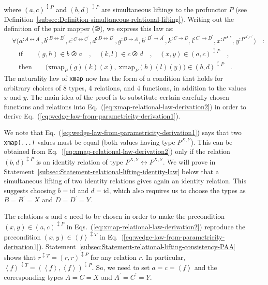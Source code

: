 where $(a,c)^{\updownarrow P}$ and $(b,d)^{\updownarrow P}$ are
simultaneous liftings to the profunctor $P$ (see Definition~\ref{subsec:Definition-simultaneous-relational-lifting}).
Writing out the definition of the pair mapper ($\ogreaterthan$),
we express this law as:
\begin{align}
 & \forall\big(a^{:A\leftrightarrow A^{\prime}},b^{:B\leftrightarrow B^{\prime}},c^{:C\leftrightarrow C^{\prime}},d^{:D\leftrightarrow D^{\prime}},g^{:B\rightarrow A},h^{:B^{\prime}\rightarrow A^{\prime}},k^{:C\rightarrow D},l^{:C^{\prime}\rightarrow D^{\prime}},x^{:P^{A,C}},y^{:P^{A^{\prime},C^{\prime}}}\big)\quad:\nonumber \\
 & \quad\text{if}\quad\quad(g,h)\in b\ogreaterthan a\quad,\quad(k,l)\in c\ogreaterthan d\quad,\quad(x,y)\in(a,c)^{\updownarrow P}\quad,\nonumber \\
 & \quad\text{then}\quad\quad\big(\text{xmap}_{P}(g)(k)(x),\:\text{xmap}_{P}(h)(l)(y)\big)\in(b,d)^{\updownarrow P}\quad.\label{eq:xmap-relational-law-derivation2}
\end{align}
The naturality law of \lstinline!xmap! now has the form of a condition
that holds for arbitrary choices of 8 types, 4 relations, and 4 functions,
in addition to the values $x$ and $y$. The main idea of the proof
is to substitute certain carefully chosen functions and relations
into Eq.~(\ref{eq:xmap-relational-law-derivation2}) in order to
derive Eq.~(\ref{eq:wedge-law-from-parametricity-derivation1}). 

We note that Eq.~(\ref{eq:wedge-law-from-parametricity-derivation1})
says that two \lstinline!xmap(...)! values must be equal (both values
having type $P^{X,Y}$). This can be obtained from Eq.~(\ref{eq:xmap-relational-law-derivation2})
only if the relation $(b,d)^{\updownarrow P}$ is an identity relation
of type $P^{X,Y}\leftrightarrow P^{X,Y}$. We will prove in Statement~\ref{subsec:Statement-relational-lifting-identity-law}
below that a simultaneous lifting of two identity relations gives
again an identity relation. This suggests choosing $b=\text{id}$
and $d=\text{id}$, which also requires us to choose the types as
$B=B^{\prime}=X$ and $D=D^{\prime}=Y$.

The relations $a$ and $c$ need to be chosen in order to make the
precondition $(x,y)\in(a,c)^{\updownarrow P}$ in Eqs.~(\ref{eq:xmap-relational-law-derivation2})
reproduce the precondition $(x,y)\in\left<f\right>^{\updownarrow T}$
in Eq.~(\ref{eq:wedge-law-from-parametricity-derivation1}). Statement~\ref{subsec:Statement-relational-lifting-consistency-PAA}
shows that $r^{\updownarrow T}=(r,r)^{\updownarrow P}$ for any relation
$r$. In particular, $\left<f\right>^{\updownarrow T}=(\left<f\right>,\left<f\right>)^{\updownarrow P}$.
So, we need to set $a=c=\left<f\right>$ and the corresponding types
$A=C=X$ and $A^{\prime}=C^{\prime}=Y$.

